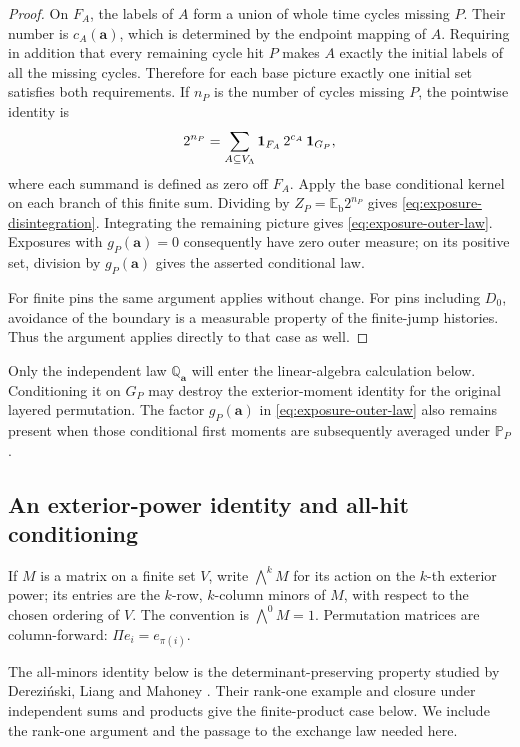 \begin{proof}
On \(F_A\), the labels of \(A\) form a union of whole time cycles
missing \(P\).  Their number is \(c_A(\mathbf a)\), which is determined
by the endpoint mapping of \(A\).  Requiring in addition that every
remaining cycle hit \(P\) makes \(A\) exactly the initial labels of
all the missing cycles.  Therefore for each base picture exactly one
initial set satisfies both requirements.  If \(n_P\) is the number of
cycles missing \(P\), the pointwise identity is
\begin{equation}
 2^{n_P}
   =\sum_{A\subseteq V_\Lambda}
       \mathbf 1_{F_A}\,2^{c_A}\,\mathbf 1_{G_P},
 \label{eq:exposure-branch-identity}
\end{equation}
where each summand is defined as zero off \(F_A\).
Apply the base conditional kernel on each branch of this finite sum.
Dividing by \(Z_P=\mathbb E_{\mathrm b}2^{n_P}\) gives
\eqref{eq:exposure-disintegration}.  Integrating the remaining picture
gives \eqref{eq:exposure-outer-law}.  Exposures with
\(g_P(\mathbf a)=0\) consequently have zero outer measure; on its
positive set, division by \(g_P(\mathbf a)\) gives the asserted
conditional law.

For finite pins the same argument applies without change.  For pins
including \(D_0\), avoidance of the boundary is a measurable property
of the finite-jump histories.  Thus the argument applies directly to
that case as well.
\end{proof}

Only the independent law \(\mathbb Q_{\mathbf a}\) will enter the
linear-algebra calculation below.  Conditioning it on \(G_P\) may
destroy the exterior-moment identity for the original layered
permutation.  The factor \(g_P(\mathbf a)\) in
\eqref{eq:exposure-outer-law} also remains present when those conditional
first moments are subsequently averaged under \(\mathbb P_P\).

\subsection{An exterior-power identity and all-hit conditioning}

If \(M\) is a matrix on a finite set \(V\), write
\(\bigwedge^k M\) for its action on the \(k\)-th exterior power; its
entries are the \(k\)-row, \(k\)-column minors of \(M\), with respect
to the chosen ordering of \(V\).  The convention is
\(\bigwedge^0M=1\).  Permutation matrices are column-forward:
\(\Pi e_i=e_{\pi(i)}\).

The all-minors identity below is the determinant-preserving property
studied by Derezi\'nski, Liang and Mahoney
\cite[Definition~4, Example~2, and Lemma~4]{DerezinskiLiangMahoney2020}.
Their rank-one example and closure under independent sums and products
give the finite-product case below.  We include the rank-one argument and the
passage to the exchange law needed here.

